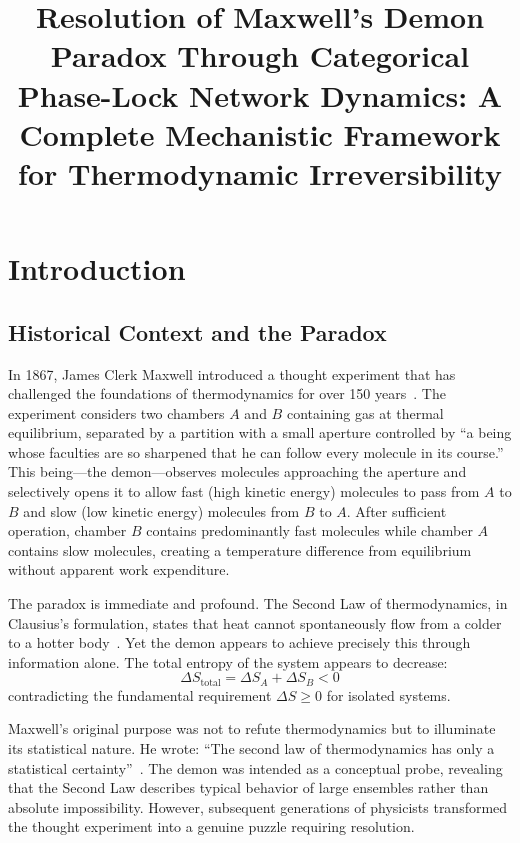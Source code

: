 \title{Resolution of Maxwell's Demon Paradox Through Categorical Phase-Lock Network Dynamics: A Complete Mechanistic Framework for Thermodynamic Irreversibility}

\section{Introduction}
\label{sec:introduction}

\subsection{Historical Context and the Paradox}

In 1867, James Clerk Maxwell introduced a thought experiment that has challenged the foundations of thermodynamics for over 150 years~\cite{maxwell1871theory}. The experiment considers two chambers $A$ and $B$ containing gas at thermal equilibrium, separated by a partition with a small aperture controlled by ``a being whose faculties are so sharpened that he can follow every molecule in its course.'' This being---the demon---observes molecules approaching the aperture and selectively opens it to allow fast (high kinetic energy) molecules to pass from $A$ to $B$ and slow (low kinetic energy) molecules from $B$ to $A$. After sufficient operation, chamber $B$ contains predominantly fast molecules while chamber $A$ contains slow molecules, creating a temperature difference from equilibrium without apparent work expenditure.

The paradox is immediate and profound. The Second Law of thermodynamics, in Clausius's formulation, states that heat cannot spontaneously flow from a colder to a hotter body~\cite{clausius1865mechanical}. Yet the demon appears to achieve precisely this through information alone. The total entropy of the system appears to decrease:
\begin{equation}
\Delta S_{\text{total}} = \Delta S_A + \Delta S_B < 0
\label{eq:entropy_decrease}
\end{equation}
contradicting the fundamental requirement $\Delta S \geq 0$ for isolated systems.

Maxwell's original purpose was not to refute thermodynamics but to illuminate its statistical nature. He wrote: ``The second law of thermodynamics has only a statistical certainty''~\cite{maxwell1878tait}. The demon was intended as a conceptual probe, revealing that the Second Law describes typical behavior of large ensembles rather than absolute impossibility. However, subsequent generations of physicists transformed the thought experiment into a genuine puzzle requiring resolution.

